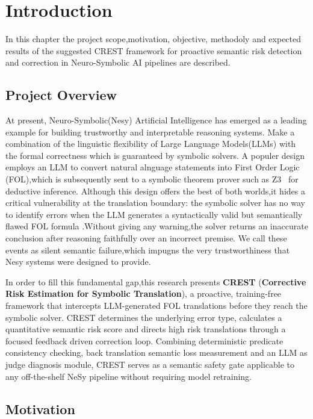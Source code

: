 \chapter{Introduction}

In this chapter the project scope,motivation, objective, methodoly and expected results of the suggested CREST framework for proactive semantic risk detection and correction in Neuro-Symbolic AI pipelines are described.

\section{Project Overview}

At present, Neuro-Symbolic(Nesy) Artificial Intelligence has emerged as a leading example for building trustworthy and interpretable reasoning systems. Make a combination of the linguistic flexibility of Large Language Models(LLMs) with the formal correctness which is guaranteed by symbolic solvers. A populer design employs an LLM to convert natural alnguage statements into First Order Logic (FOL),which is subsequently sent to a symbolic theorem prover such as   Z3~\cite{demoura2008z3} for deductive inference. Although this design offers the best of both worlds,it hides a critical vulnerability at the translation boundary: the symbolic solver has no way to identify errors  when the LLM generates a syntactically valid but semantically flawed FOL formula .Without giving any warning,the solver returns an inaccurate conclusion after reasoning faithfully over an incorrect premise. We call these events as silent semantic failure,which impugns the very trustworthiness that Nesy systems were designed to provide.

In order to  fill this fundamental gap,this research presents \textbf{CREST} (\textbf{Corrective Risk Estimation for Symbolic Translation}), a proactive, training-free framework that intercepts LLM-generated FOL translations before they reach the symbolic solver. CREST determines the underlying error type, calculates a quantitative semantic risk score and directs high risk translations through a focused feedback driven correction loop. Combining deterministic predicate consistency checking, back translation semantic loss measurement and an LLM as judge diagnosis module, CREST serves as a semantic safety gate applicable to any off-the-shelf NeSy pipeline without requiring model retraining.

\section{Motivation}

